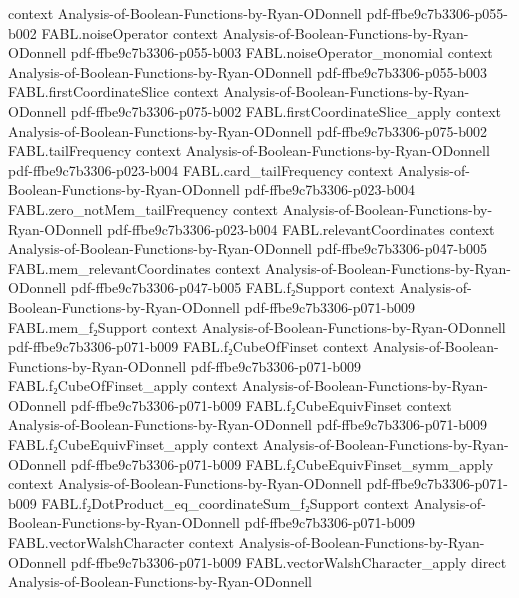 \begin{theorem}
  {context}
  {Analysis-of-Boolean-Functions-by-Ryan-ODonnell}
  {pdf-ffbe9c7b3306-p055-b002}
\proofstep
  {FABL.noiseOperator}
  {context}
  {Analysis-of-Boolean-Functions-by-Ryan-ODonnell}
  {pdf-ffbe9c7b3306-p055-b003}
\proofstep
  {FABL.noiseOperator_monomial}
  {context}
  {Analysis-of-Boolean-Functions-by-Ryan-ODonnell}
  {pdf-ffbe9c7b3306-p055-b003}
\proofstep
  {FABL.firstCoordinateSlice}
  {context}
  {Analysis-of-Boolean-Functions-by-Ryan-ODonnell}
  {pdf-ffbe9c7b3306-p075-b002}
\proofstep
  {FABL.firstCoordinateSlice_apply}
  {context}
  {Analysis-of-Boolean-Functions-by-Ryan-ODonnell}
  {pdf-ffbe9c7b3306-p075-b002}
\proofstep
  {FABL.tailFrequency}
  {context}
  {Analysis-of-Boolean-Functions-by-Ryan-ODonnell}
  {pdf-ffbe9c7b3306-p023-b004}
\proofstep
  {FABL.card_tailFrequency}
  {context}
  {Analysis-of-Boolean-Functions-by-Ryan-ODonnell}
  {pdf-ffbe9c7b3306-p023-b004}
\proofstep
  {FABL.zero_notMem_tailFrequency}
  {context}
  {Analysis-of-Boolean-Functions-by-Ryan-ODonnell}
  {pdf-ffbe9c7b3306-p023-b004}
\proofstep
  {FABL.relevantCoordinates}
  {context}
  {Analysis-of-Boolean-Functions-by-Ryan-ODonnell}
  {pdf-ffbe9c7b3306-p047-b005}
\proofstep
  {FABL.mem_relevantCoordinates}
  {context}
  {Analysis-of-Boolean-Functions-by-Ryan-ODonnell}
  {pdf-ffbe9c7b3306-p047-b005}
\proofstep
  {FABL.f₂Support}
  {context}
  {Analysis-of-Boolean-Functions-by-Ryan-ODonnell}
  {pdf-ffbe9c7b3306-p071-b009}
\proofstep
  {FABL.mem_f₂Support}
  {context}
  {Analysis-of-Boolean-Functions-by-Ryan-ODonnell}
  {pdf-ffbe9c7b3306-p071-b009}
\proofstep
  {FABL.f₂CubeOfFinset}
  {context}
  {Analysis-of-Boolean-Functions-by-Ryan-ODonnell}
  {pdf-ffbe9c7b3306-p071-b009}
\proofstep
  {FABL.f₂CubeOfFinset_apply}
  {context}
  {Analysis-of-Boolean-Functions-by-Ryan-ODonnell}
  {pdf-ffbe9c7b3306-p071-b009}
\proofstep
  {FABL.f₂CubeEquivFinset}
  {context}
  {Analysis-of-Boolean-Functions-by-Ryan-ODonnell}
  {pdf-ffbe9c7b3306-p071-b009}
\proofstep
  {FABL.f₂CubeEquivFinset_apply}
  {context}
  {Analysis-of-Boolean-Functions-by-Ryan-ODonnell}
  {pdf-ffbe9c7b3306-p071-b009}
\proofstep
  {FABL.f₂CubeEquivFinset_symm_apply}
  {context}
  {Analysis-of-Boolean-Functions-by-Ryan-ODonnell}
  {pdf-ffbe9c7b3306-p071-b009}
\proofstep
  {FABL.f₂DotProduct_eq_coordinateSum_f₂Support}
  {context}
  {Analysis-of-Boolean-Functions-by-Ryan-ODonnell}
  {pdf-ffbe9c7b3306-p071-b009}
\proofstep
  {FABL.vectorWalshCharacter}
  {context}
  {Analysis-of-Boolean-Functions-by-Ryan-ODonnell}
  {pdf-ffbe9c7b3306-p071-b009}
\proofstep
  {FABL.vectorWalshCharacter_apply}
  {direct}
  {Analysis-of-Boolean-Functions-by-Ryan-ODonnell}

\end{theorem}
